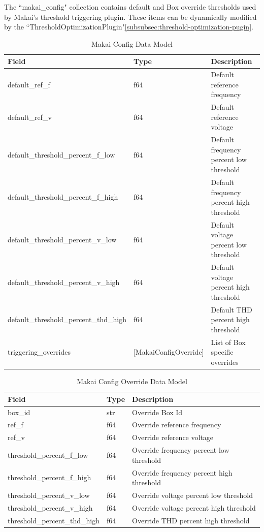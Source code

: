 The ``makai\_config" collection contains default and Box override thresholds used by Makai's threshold triggering plugin. These items can be dynamically modified by the ``ThresholdOptimizationPlugin"\ref{subsubsec:threshold-optimization-pugin}.

\begin{table}[H]
	\centering
	\caption{Makai Config Data Model}
	\begin{tabularx}{\textwidth}{XlX}
		\toprule
		\textbf{Field} & \textbf{Type} & \textbf{Description} \\
		\midrule
		default\_ref\_f & f64 & Default reference frequency \\
		default\_ref\_v & f64 & Default reference voltage \\
		default\_threshold\_percent\_f\_low & f64 & Default frequency percent low threshold \\
		default\_threshold\_percent\_f\_high & f64 & Default frequency percent high threshold \\
		default\_threshold\_percent\_v\_low & f64 & Default voltage percent low threshold \\
		default\_threshold\_percent\_v\_high & f64 & Default voltage percent high threshold \\
		default\_threshold\_percent\_thd\_high & f64 & Default THD percent high threshold \\
		triggering\_overrides & [MakaiConfigOverride] & List of Box specific overrides \\
		\bottomrule
	\end{tabularx}
	\label{table:makai_config}
\end{table}

\begin{table}[H]
	\centering
	\caption{Makai Config Override Data Model}
	\begin{tabularx}{\textwidth}{XlX}
		\toprule
		\textbf{Field} & \textbf{Type} & \textbf{Description} \\
		\midrule
		box\_id & str & Override Box Id \\
		ref\_f & f64 & Override reference frequency \\
		ref\_v & f64 & Override reference voltage \\
		threshold\_percent\_f\_low & f64 & Override frequency percent low threshold \\
		threshold\_percent\_f\_high & f64 & Override frequency percent high threshold \\
		threshold\_percent\_v\_low & f64 & Override voltage percent low threshold \\
		threshold\_percent\_v\_high & f64 & Override voltage percent high threshold \\
		threshold\_percent\_thd\_high & f64 & Override THD percent high threshold \\
		\bottomrule
	\end{tabularx}
	\label{table:makai_config_override}
\end{table}

